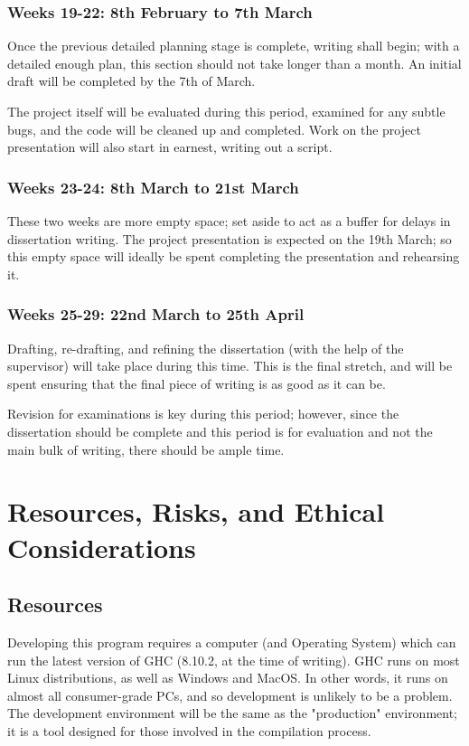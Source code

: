 \documentclass[12pt, a4paper]{scrartcl}
\begin{document}
\subsubsection{Weeks 19-22: 8th February to 7th March}

Once the previous detailed planning stage is complete, writing shall begin; with a detailed enough plan, this section should not take longer than a month. An initial draft will be completed by the 7th of March.

The project itself will be evaluated during this period, examined for any subtle bugs, and the code will be cleaned up and completed. Work on the project presentation will also start in earnest, writing out a script.

\subsubsection{Weeks 23-24: 8th March to 21st March}

These two weeks are more empty space; set aside to act as a buffer for delays in dissertation writing. The project presentation is expected on the 19th March; so this empty space will ideally be spent completing the presentation and rehearsing it.

\subsubsection{Weeks 25-29: 22nd March to 25th April}

Drafting, re-drafting, and refining the dissertation (with the help of the supervisor) will take place during this time. This is the final stretch, and will be spent ensuring that the final piece of writing is as good as it can be.

Revision for examinations is key during this period; however, since the dissertation should be complete and this period is for evaluation and not the main bulk of writing, there should be ample time.

\section{Resources, Risks, and Ethical Considerations}

\subsection{Resources}

Developing this program requires a computer (and Operating System) which can run the latest version of GHC (8.10.2, at the time of writing). GHC runs on most Linux distributions, as well as Windows and MacOS. In other words, it runs on almost all consumer-grade PCs, and so development is unlikely to be a problem. The development environment will be the same as the "production" environment; it is a tool designed for those involved in the compilation process.
\end{document}
